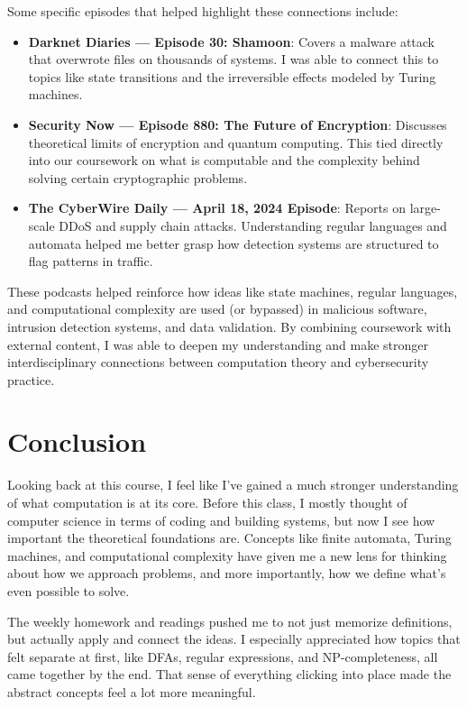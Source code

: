 \documentclass{article}
\theoremstyle{theorem}
\theoremstyle{definition}
\theoremstyle{remark}
\begin{document}
Some specific episodes that helped highlight these connections include:
\begin{itemize}
    \item \textbf{Darknet Diaries — Episode 30: Shamoon}:
    Covers a malware attack that overwrote files on thousands of systems. I was able to connect this to topics like state transitions and the irreversible effects modeled by Turing machines.
    \item \textbf{Security Now — Episode 880: The Future of Encryption}:
    Discusses theoretical limits of encryption and quantum computing. This tied directly into our coursework on what is computable and the complexity behind solving certain cryptographic problems.
    \item \textbf{The CyberWire Daily — April 18, 2024 Episode}:
    Reports on large-scale DDoS and supply chain attacks. Understanding regular languages and automata helped me better grasp how detection systems are structured to flag patterns in traffic.
\end{itemize}

These podcasts helped reinforce how ideas like state machines, regular languages, and computational complexity are used (or bypassed) in malicious software, intrusion detection systems, and data validation. By combining coursework with external content, I was able to deepen my understanding and make stronger interdisciplinary connections between computation theory and cybersecurity practice.

\section{Conclusion}\label{conclusion}

Looking back at this course, I feel like I’ve gained a much stronger understanding of what computation is at its core. Before this class, I mostly thought of computer science in terms of coding and building systems, but now I see how important the theoretical foundations are. Concepts like finite automata, Turing machines, and computational complexity have given me a new lens for thinking about how we approach problems, and more importantly, how we define what’s even possible to solve.

The weekly homework and readings pushed me to not just memorize definitions, but actually apply and connect the ideas. I especially appreciated how topics that felt separate at first, like DFAs, regular expressions, and NP-completeness, all came together by the end. That sense of everything clicking into place made the abstract concepts feel a lot more meaningful.
\end{document}
